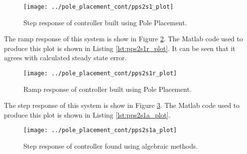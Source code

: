 \documentclass{article}
\newcommand{\sincludepdf}[2][]{
	
}
\begin{document}
\begin{figure}[h!]
\begin{center}
\texttt{[image: ../pole\_placement\_cont/pps2s1\_plot]}
\end{center}
\caption{Step response of controller built using Pole Placement.}
\label{fig:pps2s1_plot}
\end{figure}



\sincludepdf[pages={4}]{scan/11241301.pdf}

The ramp response of this system is show in Figure \ref{fig:pps2s1r_plot}.
The Matlab code used to produce this plot is shown
in Listing \ref{lst:pps2s1r_plot}.
It can be seen that it agrees with calculated steady state error.

\begin{figure}[h!]
\begin{center}
\texttt{[image: ../pole\_placement\_cont/pps2s1r\_plot]}
\end{center}
\caption{Ramp response of controller built using Pole Placement.}
\label{fig:pps2s1r_plot}
\end{figure}




\clearpage
\sincludepdf[pages={4},
			pagecommand=\subsection*{Example 2}
	]{scan/11231301.pdf}

The step response of this system is show in Figure \ref{fig:pps2s1a_plot}.
The Matlab code used to produce this plot is shown
in Listing \ref{lst:pps2s1a_plot}.

\begin{figure}[h!]
\begin{center}
\texttt{[image: ../pole\_placement\_cont/pps2s1a\_plot]}
\end{center}
\caption{Step response of controller found using algebraic methods.}
\label{fig:pps2s1a_plot}
\end{figure}


\end{document}
